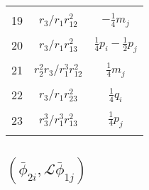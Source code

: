 \documentclass[Dissertation.tex]{subfiles}
\begin{document}
\begin{center}
\begin{longtable}{|c|c|c|}
&  &  \\
19  & $r_3/r_1 r_{12}^2$  & $-\frac{1}{4} m_j$ \\
&  &  \\
20  & $r_3/r_1 r_{13}^2$  & $\frac{1}{4}p_i - \frac{1}{2}p_j$ \\
&  &  \\
21  & $r_2^2 r_3/r_1^3 r_{12}^2$  & $\frac{1}{4}m_j$ \\
&  &  \\
22  & $r_3/r_1 r_{23}^2$  & $\frac{1}{4}q_i$ \\
&  &  \\
23  & $r_3^3/r_1^3 r_{13}^2$  & $\frac{1}{4}p_j$ \\
&  &  \\
\end{longtable}
\end{center}

\subsection{\texorpdfstring{${(\bar\phi_{2i}, \mathcal{L} \bar\phi_{1j})}$}{(phi2i, L phi1j)}}
\end{document}
